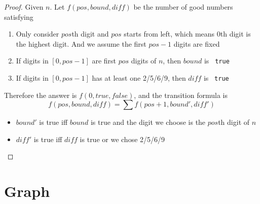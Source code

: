 \documentclass[11pt]{article}
\let\OldTexttt\texttt
\renewcommand{\texttt}[1]{\OldTexttt{\color{MidnightBlue} #1}}
\begin{document}
\begin{proof}
Given \(n\).
Let \(f(pos,bound,diff)\) be the number of good numbers satisfying
\begin{enumerate}
\item Only consider \(pos\)th digit and \(pos\) starts from left, which means 0th digit is the
highest digit. And we assume the first \(pos-1\)
digits are fixed
\item If digits in \([0,pos-1]\) are first \(pos\) digits of \(n\), then \(bound\) is \texttt{true}
\item If digits in \([0,pos-1]\) has at least one 2/5/6/9, then \(diff\) is \texttt{true}
\end{enumerate}

Therefore the answer is \(f(0, true, false)\), and the transition formula is
\begin{equation*}
f(pos,bound,diff)=\sum f(pos+1,bound',diff')
\end{equation*}
\begin{itemize}
\item \(bound'\) is true iff \(bound\) is true and the digit we choose is the \(pos\)th digit
of \(n\)
\item \(diff'\) is true iff \(diff\) is true or we chose 2/5/6/9
\end{itemize}
\end{proof}
\section{Graph}
\label{sec:org4eecb4b}
\end{document}
